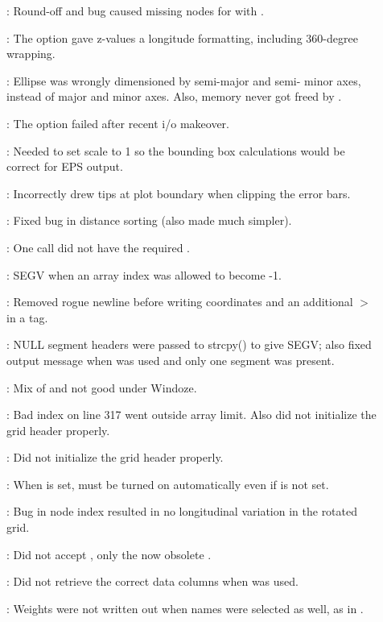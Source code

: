 \begin{description}
	\item []:	Round-off and bug caused missing nodes for  with .
	\item []:	The  option gave z-values a longitude formatting, including 360-degree wrapping.
	\item []:	Ellipse was wrongly dimensioned by semi-major and semi-
		minor axes, instead of major and minor axes.  Also, memory never got freed by .
	\item []:	The  option failed after recent i/o makeover.
	\item []:	Needed to set scale to 1 so the bounding box
		calculations would be correct for EPS output.
	\item []:	Incorrectly drew tips at plot boundary when clipping the error bars.
	\item []:	Fixed bug in distance sorting (also made much simpler).
	\item []:	One  call did not have the required .
	\item []:	SEGV when an array index was allowed to become -1.
	\item []:	Removed rogue newline before writing coordinates and an additional $>$ in a tag.
	\item []:	NULL segment headers were passed to strcpy() to give SEGV; also
		fixed output message when  was used and only one segment was present.
	\item []:	Mix of  and  not good under Windoze.
	\item []:	Bad index on line 317 went outside array limit.  Also did not initialize the grid header properly.
	\item []:	Did not initialize the grid header properly.
	\item []:	When  is set,  must be turned on automatically
		even if  is not set.
	\item []:	Bug in node index resulted in no longitudinal variation in the rotated grid.
	\item []:	Did not accept , only the now obsolete .
	\item []:	Did not retrieve the correct data columns when  was used.
	\item []:	Weights were not written out when names were selected as well, as in .
\end{description}

